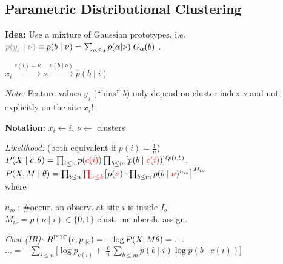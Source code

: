 \subsection{Parametric Distributional Clustering}

\textbf{Idea:} Use a mixture of Gaussian prototypes, i.e.\\  $\textcolor{gray}{p(y_j\mid\nu)\equiv\:} p(b\mid\nu) = \sum_{\alpha\leq s} p(\alpha\vert\nu) \; G_\alpha(b)$ .

\begin{minipage}{\linewidth}
    \centering
    $x_i \xrightarrow{c(i) = \nu} \nu \xrightarrow{p(b\mid\nu)} \hat p(b\mid i)$
\end{minipage}

\textit{Note:}\enspace
Feature values $y_j$ (``bins'' $b$) only depend on cluster index $\nu$ and not explicitly on the site $x_i$!

\textbf{Notation:}\enspace
$x_i \leftarrow i$, \enskip
{} \enskip
$\nu \leftarrow$ clusters

\emph{Likelihood:}\enspace
(both equivalent if $p(i)=\frac1n$)\\
\enspace $P(X\mid c,\theta) = \prod_{i\leq n} p(\textcolor{red}{c(i)}) \prod_{b\leq m} [p(b\mid \textcolor{red}{c(i)})]^{\ell \hat p(i,b)}$,\\
\enspace $P(X,M\mid \theta) = \prod_{i\leq n} \textcolor{red}{\prod_{\nu\leq k}} \big[ p(\textcolor{red}{\nu}) \cdot \prod_{b\leq m} p(b\mid\textcolor{red}{\nu})^{n_{ib}} \big]^{M_{i\nu}}$
\\
where\enskip
\begin{minipage}[t]{\linewidth-\widthof{where\enskip}}
    $n_{ib}$ : \#occur. an observ. at site $i$ is inside $I_b$ \\
    $M_{i\nu} = p(\nu\mid i) \in \{0,1\}$ \enskip clust. membersh. assign.
\end{minipage}

\emph{Cost (IB):}\enspace
$R^\mathrm{PDC}(c, p_{\cdot\mid c}) = -\log P(X,M\theta) = \ldots$
\hfill $\ldots = -\sum_{i\leq n} \big[ \log p_{c(i)} + \frac{\ell}{n} \sum_{b\leq m} \hat p(b\mid i) \log p(b\mid c(i)) \big]$\\


